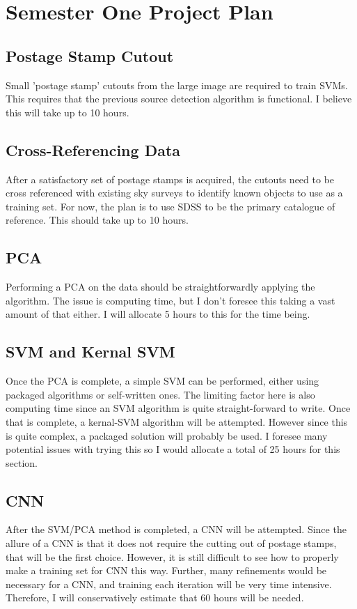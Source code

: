 \documentclass[a4paper,fleqn,usenatbib]{mnras}
\begin{document}
\section{Semester One Project Plan}
\label{App:project plan}
\subsection{Postage Stamp Cutout}
Small 'postage stamp' cutouts from the large image are required to train SVMs. This requires that the previous source detection algorithm is functional. I believe this will take up to 10 hours. 
\subsection{Cross-Referencing Data}
After a satisfactory set of postage stamps is acquired, the cutouts need to be cross referenced with existing sky surveys to identify known objects to use as a training set. For now, the plan is to use SDSS to be the primary catalogue of reference. This should take up to 10 hours.
\subsection{PCA}
Performing a PCA on the data should be straightforwardly applying the algorithm. The issue is computing time, but I don't foresee this taking a vast amount of that either. I will allocate 5 hours to this for the time being.
\subsection{SVM and Kernal SVM}
Once the PCA is complete, a simple SVM can be performed, either using packaged algorithms or self-written ones. The limiting factor here is also computing time since an SVM algorithm is quite straight-forward to write.
Once that is complete, a kernal-SVM algorithm will be attempted. However since this is quite complex, a packaged solution will probably be used. I foresee many potential issues with trying this so I would allocate a total of 25 hours for this section.
\subsection{CNN}
After the SVM/PCA method is completed, a CNN will be attempted. Since the allure of a CNN is that it does not require the cutting out of postage stamps, that will be the first choice. However, it is still difficult to see how to properly make a training set for CNN this way. Further, many refinements would be necessary for a CNN, and training each iteration will be very time intensive. Therefore, I will conservatively estimate that 60 hours will be needed.
\end{document}

